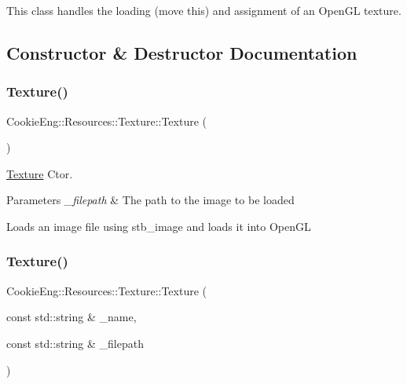 This class handles the loading (move this) and assignment of an Open\+GL texture. 

\subsection{Constructor \& Destructor Documentation}
\mbox{\label{class_cookie_eng_1_1_resources_1_1_texture_ae7d09944ac0d60a971de919b2fd7108d}} 
\subsubsection{\texorpdfstring{Texture()}{Texture()}\hspace{0.1cm}{\footnotesize\ttfamily [1/2]}}
{\footnotesize\ttfamily Cookie\+Eng\+::\+Resources\+::\+Texture\+::\+Texture (\begin{DoxyParamCaption}{ }\end{DoxyParamCaption})}



\hyperlink{class_cookie_eng_1_1_resources_1_1_texture}{Texture} Ctor. 


\begin{DoxyParams}{Parameters}
{\em \+\_\+filepath} & The path to the image to be loaded\\
\hline
\end{DoxyParams}
Loads an image file using stb\+\_\+image and loads it into Open\+GL \mbox{\label{class_cookie_eng_1_1_resources_1_1_texture_a8bcbd117b436060b0540c3c80dc88b54}} 
\subsubsection{\texorpdfstring{Texture()}{Texture()}\hspace{0.1cm}{\footnotesize\ttfamily [2/2]}}
{\footnotesize\ttfamily Cookie\+Eng\+::\+Resources\+::\+Texture\+::\+Texture (\begin{DoxyParamCaption}\item[{const std\+::string \&}]{\+\_\+name,  }\item[{const std\+::string \&}]{\+\_\+filepath }\end{DoxyParamCaption})}



